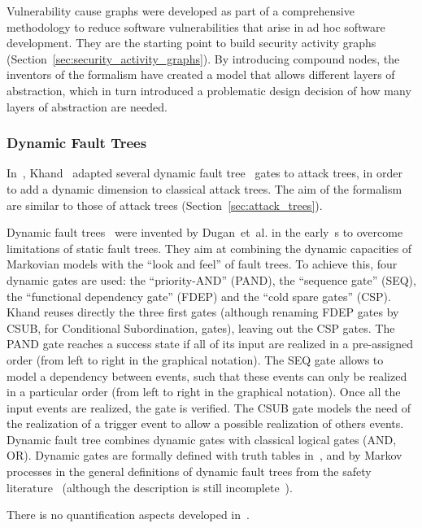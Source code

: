 \documentclass[a4paper]{article}
\begin{document}
Vulnerability cause graphs were developed as part of a comprehensive
methodology to reduce software vulnerabilities that arise in ad hoc software
development. They are the starting point to build security activity graphs
(Section~\ref{sec:security_activity_graphs}). By introducing compound nodes,
the inventors of the formalism have created a model that allows different 
layers of abstraction, which in turn introduced a problematic design
decision of how many layers of abstraction are needed.

\subsubsection{Dynamic Fault Trees} 
\label{sec:dynamic_fault_trees}

In~, Khand~\cite{Khan} adapted several dynamic fault 
tree~\cite{Dugan1990,DuBaBo} gates to attack trees, in order to add a dynamic
dimension to classical attack trees. The aim of the formalism are similar
to those of attack trees (Section~\ref{sec:attack_trees}).

Dynamic fault trees~\cite{Dugan1990,DuBaBo} were invented by Dugan~et~al. in
the early~s to overcome limitations of static fault trees. They aim at
combining the dynamic capacities of Markovian models with the ``look and feel''
of fault trees. To achieve this, four dynamic gates are used: the
``priority-AND'' (PAND), the ``sequence gate'' (SEQ), the ``functional 
dependency gate'' (FDEP) and the ``cold spare gates'' (CSP). Khand reuses 
directly the three first gates (although renaming FDEP gates by CSUB, for 
Conditional Subordination, gates), leaving out the CSP gates. The PAND gate 
reaches a success state if all of its input are realized in a pre-assigned 
order (from left to right in the graphical notation). The SEQ gate allows to 
model a dependency between events, such that these events can only be realized 
in a particular order (from left to right in the graphical notation). Once all 
the input events are realized, the gate is verified. The CSUB gate models the 
need of the realization of a trigger event to allow a possible realization of 
others events. Dynamic fault tree combines dynamic gates with classical logical 
gates (AND, OR). Dynamic gates are formally defined with truth tables 
in~\cite{Khan}, and by Markov processes in the general definitions of dynamic 
fault trees from the safety literature~\cite{Dugan1990,DuBaBo} (although the 
description is still incomplete~\cite{Boui}).

There is no quantification aspects developed in~\cite{Khan}.
\end{document}

